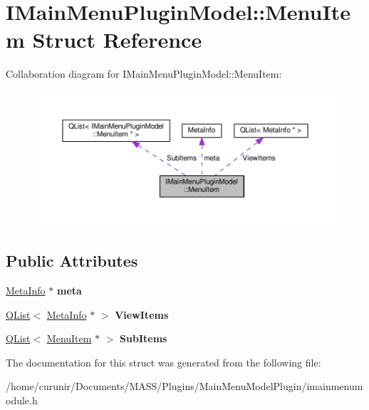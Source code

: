 \hypertarget{struct_i_main_menu_plugin_model_1_1_menu_item}{}\section{I\+Main\+Menu\+Plugin\+Model\+:\+:Menu\+Item Struct Reference}
\label{struct_i_main_menu_plugin_model_1_1_menu_item}


Collaboration diagram for I\+Main\+Menu\+Plugin\+Model\+:\+:Menu\+Item\+:\nopagebreak
\begin{figure}[H]
\begin{center}
\leavevmode
\includegraphics[width=350pt]{struct_i_main_menu_plugin_model_1_1_menu_item__coll__graph}
\end{center}
\end{figure}
\subsection*{Public Attributes}
\begin{DoxyCompactItemize}
\item 
\hyperlink{struct_meta_info}{Meta\+Info} $\ast$ {\bfseries meta}\hypertarget{struct_i_main_menu_plugin_model_1_1_menu_item_a1750991191ace60981315c7095723346}{}\label{struct_i_main_menu_plugin_model_1_1_menu_item_a1750991191ace60981315c7095723346}

\item 
\hyperlink{class_q_list}{Q\+List}$<$ \hyperlink{struct_meta_info}{Meta\+Info} $\ast$ $>$ {\bfseries View\+Items}\hypertarget{struct_i_main_menu_plugin_model_1_1_menu_item_a5576d4664cf1e226fbbbd5875239e0ae}{}\label{struct_i_main_menu_plugin_model_1_1_menu_item_a5576d4664cf1e226fbbbd5875239e0ae}

\item 
\hyperlink{class_q_list}{Q\+List}$<$ \hyperlink{struct_i_main_menu_plugin_model_1_1_menu_item}{Menu\+Item} $\ast$ $>$ {\bfseries Sub\+Items}\hypertarget{struct_i_main_menu_plugin_model_1_1_menu_item_a945944fea3f6fe92c7fdec32bee522a8}{}\label{struct_i_main_menu_plugin_model_1_1_menu_item_a945944fea3f6fe92c7fdec32bee522a8}

\end{DoxyCompactItemize}


The documentation for this struct was generated from the following file\+:\begin{DoxyCompactItemize}
\item 
/home/curunir/\+Documents/\+M\+A\+S\+S/\+Plugins/\+Main\+Menu\+Model\+Plugin/imainmenumodule.\+h\end{DoxyCompactItemize}

